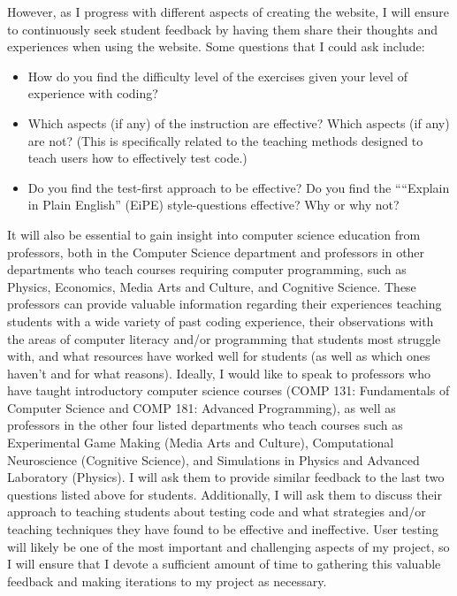 \documentclass[10pt,twocolumn]{article}
\begin{document}
However, as I progress with different aspects of creating the website, I will ensure to continuously seek student feedback by having them share their thoughts and experiences when using the website. Some questions that I could ask include:
\begin{itemize}
    \item{How do you find the difficulty level of the exercises given your level of experience with coding?}
    \item{Which aspects (if any) of the instruction are effective? Which aspects (if any) are not? (This is specifically related to the teaching methods designed to teach users how to effectively test code.)}
    \item{Do you find the test-first approach to be effective? Do you find the ““Explain in Plain English” (EiPE) style-questions effective? Why or why not?}
\end{itemize}

It will also be essential to gain insight into computer science education from professors, both in the Computer Science department and professors in other departments who teach courses requiring computer programming, such as Physics, Economics, Media Arts and Culture, and Cognitive Science. These professors can provide valuable information regarding their experiences teaching students with a wide variety of past coding experience, their observations with the areas of computer literacy and/or programming that students most struggle with, and what resources have worked well for students (as well as which ones haven’t and for what reasons). Ideally, I would like to speak to professors who have taught introductory computer science courses (COMP 131: Fundamentals of Computer Science and COMP 181: Advanced Programming), as well as professors in the other four listed departments who teach courses such as Experimental Game Making (Media Arts and Culture), Computational Neuroscience (Cognitive Science), and Simulations in Physics and Advanced Laboratory (Physics). I will ask them to provide similar feedback to the last two questions listed above for students. Additionally, I will ask them to discuss their approach to teaching students about testing code and what strategies and/or teaching techniques they have found to be effective and ineffective. User testing will likely be one of the most important and challenging aspects of my project, so I will ensure that I devote a sufficient amount of time to gathering this valuable feedback and making iterations to my project as necessary.
\end{document}
